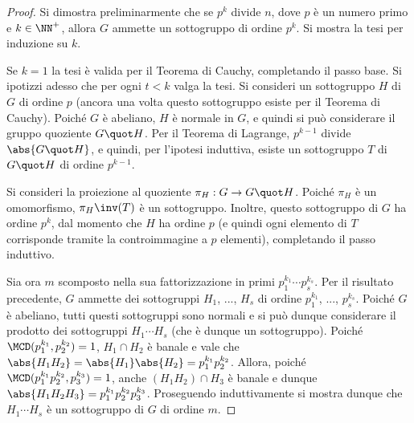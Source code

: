 \documentclass[12pt]{scrartcl}
\begin{document}
	\begin{proof}
		Si dimostra preliminarmente che se $p^k$ divide $n$,
		dove $p$ è un numero primo e $k \in \NN^+$, allora
		$G$ ammette un sottogruppo di ordine $p^k$. Si
		mostra la tesi per induzione su $k$. \medskip
		
		
		Se $k=1$ la tesi è valida per il Teorema di Cauchy, completando il passo base. Si ipotizzi adesso
		che per ogni $t < k$ valga la tesi. Si consideri
		un sottogruppo $H$ di $G$ di ordine $p$
		(ancora una volta questo sottogruppo esiste per il
		Teorema di Cauchy). Poiché $G$ è abeliano, $H$ è
		normale in $G$, e quindi si può considerare il
		gruppo quoziente $G \quot H$. Per il Teorema di
		Lagrange, $p^{k-1}$ divide $\abs{G \quot H}$, e
		quindi, per l'ipotesi induttiva, esiste un sottogruppo
		$T$ di $G \quot H$ di ordine $p^{k-1}$. \medskip
		
		
		Si consideri la proiezione al quoziente $\pi_H : G \to G \quot H$. Poiché $\pi_H$ è un omomorfismo,
		$\pi_H\inv(T)$ è un sottogruppo. Inoltre, questo sottogruppo di $G$ ha ordine $p^k$, dal momento che $H$ ha ordine $p$
		(e quindi ogni elemento di $T$ corrisponde tramite
		la controimmagine a $p$ elementi), completando il passo
		induttivo. \medskip
		
		
		Sia ora $m$ scomposto nella sua fattorizzazione in primi
		$p_1^{k_1} \cdots p_s^{k_s}$. Per il risultato precedente,
		$G$ ammette dei sottogruppi $H_1$, ..., $H_s$ di ordine
		$p_1^{k_1}$, ..., $p_s^{k_s}$. Poiché $G$ è abeliano,
		tutti questi sottogruppi sono normali e si può dunque
		considerare il prodotto dei sottogruppi $H_1 \cdots H_s$
		(che è dunque un sottogruppo). Poiché
		$\MCD(p_1^{k_1}, p_2^{k_2})=1$, $H_1 \cap H_2$ è banale e vale
		che $\abs{H_1 H_2} = \abs{H_1} \abs{H_2} = p_1^{k_1} p_2^{k_2}$.
		Allora, poiché $\MCD(p_1^{k_1} p_2^{k_2}, p_3^{k_3}) = 1$, anche $(H_1H_2) \cap H_3$ è banale e dunque $\abs{H_1 H_2 H_3} =
		p_1^{k_1} p_2^{k_2} p_3^{k_3}$. Proseguendo induttivamente
		si mostra dunque che $H_1 \cdots H_s$ è un sottogruppo
		di $G$ di ordine $m$.
	\end{proof}
\end{document}
